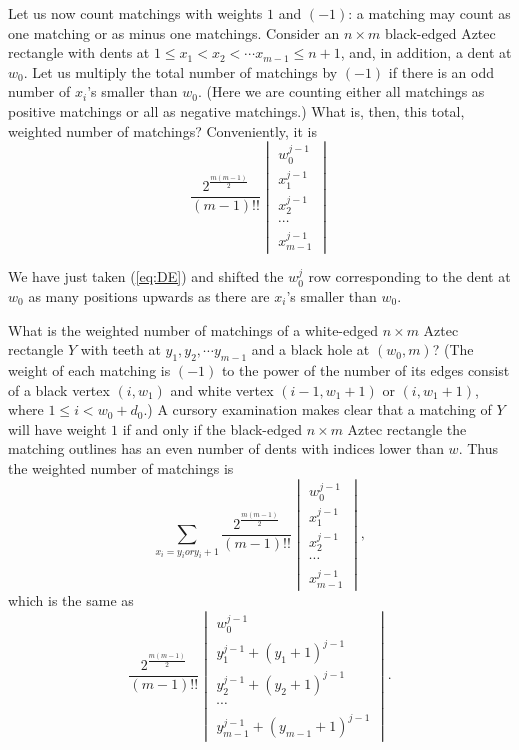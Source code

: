 \documentclass[10pt,reqno]{amsart}
\theoremstyle{plain}
\theoremstyle{definition}
\theoremstyle{remark}
\begin{document}
Let us now count matchings with weights $1$ and $(-1)$: a matching may count
as one matching or as minus one matchings. Consider an $n\times m$ black-edged
Aztec rectangle with dents at $1\leq x_1<x_2<\dotsb x_{m-1}\leq n+1$,
and, in addition, a dent at $w_0$. Let us multiply the total number of 
matchings by $(-1)$ if there is an odd number of $x_i$'s smaller than $w_0$. 
(Here we are counting either all matchings as positive matchings or all
as negative matchings.) What is, then, this total, weighted number of
matchings? Conveniently, it is
\begin{equation} 
 \frac{2^{\frac{m(m-1)}{2}}}{(m-1)!!} 
  \begin{vmatrix}
	w_0^{j-1} \\
	x_1^{j-1} \\
	x_2^{j-1} \\
	\dotsb \\
	x_{m-1}^{j-1}
  \end{vmatrix}
\end{equation}

We have just taken (\ref{eq:DE}) and shifted the $w_0^j$ row corresponding
to the dent at $w_0$ as many positions upwards as there are $x_i$'s smaller
than $w_0$.

What is the weighted number of matchings of a white-edged $n\times m$ Aztec
rectangle $Y$ with teeth at $y_1,y_2,\dotsb y_{m-1}$ and a black hole
at $(w_0,m)$? (The weight of each matching is  $(-1)$ to the power of the number
of its edges consist of a black vertex $(i,w_1)$ and white vertex
$(i-1,w_1+1)$ or $(i,w_1+1)$, where $1\leq i<w_0+d_0$.)
A cursory examination makes clear 
that a matching of $Y$ will have weight $1$ if and only if the black-edged 
$n\times m$
Aztec rectangle the matching outlines has an even number of dents with indices
lower than $w$. Thus the weighted number of matchings is
\begin{equation}
\sum_{x_i=y_i or y_i+1}
\frac{2^{\frac{m(m-1)}{2}}}{(m-1)!!} 
  \begin{vmatrix}
	w_0^{j-1} \\
	x_1^{j-1} \\
	x_2^{j-1} \\
	\dotsb \\
	x_{m-1}^{j-1}
  \end{vmatrix},
\end{equation}
which is the same as
\begin{equation}
\frac{2^{\frac{m(m-1)}{2}}}{(m-1)!!} 
\begin{vmatrix}
	w_0^{j-1} \\
	y_1^{j-1} + (y_1+1)^{j-1} \\
	y_2^{j-1} + (y_2+1)^{j-1} \\
	\dotsb \\
	y_{m-1}^{j-1} + (y_{m-1}+1)^{j-1}
\end{vmatrix}.
\end{equation}
\end{document}
